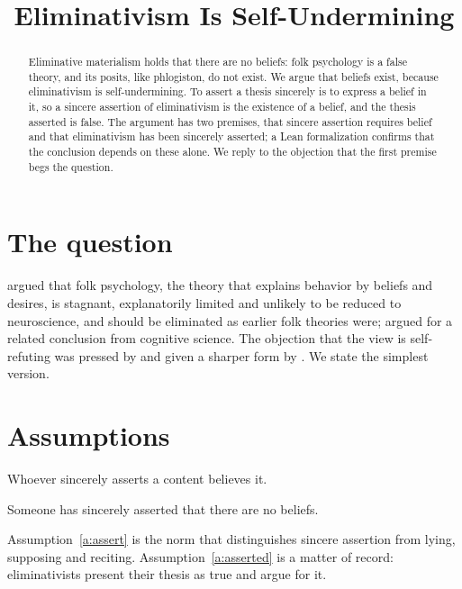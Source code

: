 \documentclass{situationist-preprint}
\title{Eliminativism Is Self-Undermining}
\begin{document}
\maketitle

\begin{abstract}
Eliminative materialism holds that there are no beliefs: folk psychology is a false theory, and its posits, like phlogiston, do not exist. We argue that beliefs exist, because eliminativism is self-undermining. To assert a thesis sincerely is to express a belief in it, so a sincere assertion of eliminativism is the existence of a belief, and the thesis asserted is false. The argument has two premises, that sincere assertion requires belief and that eliminativism has been sincerely asserted; a Lean formalization confirms that the conclusion depends on these alone. We reply to the objection that the first premise begs the question.
\end{abstract}

\section{The question}

\citet{Churchland1981} argued that folk psychology, the theory that explains behavior by beliefs and desires, is stagnant, explanatorily limited and unlikely to be reduced to neuroscience, and should be eliminated as earlier folk theories were; \citet{Stich1983} argued for a related conclusion from cognitive science. The objection that the view is self-refuting was pressed by \citet{Baker1987} and given a sharper form by \citet{Boghossian1990}. We state the simplest version.

\section{Assumptions}

\begin{assumption}\label{a:assert}
Whoever sincerely asserts a content believes it.
\end{assumption}

\begin{assumption}\label{a:asserted}
Someone has sincerely asserted that there are no beliefs.
\end{assumption}

Assumption~\ref{a:assert} is the norm that distinguishes sincere assertion from lying, supposing and reciting. Assumption~\ref{a:asserted} is a matter of record: eliminativists present their thesis as true and argue for it.
\end{document}
